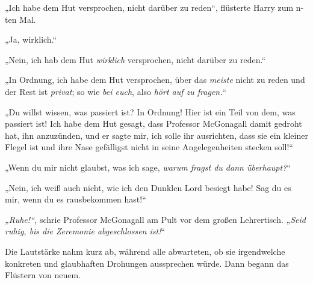 „Ich habe dem Hut versprochen, nicht darüber zu reden“, flüsterte Harry zum n-ten Mal.

„Ja, wirklich.“

„Nein, ich hab dem Hut \emph{wirklich} versprochen, nicht darüber zu reden.“

„In Ordnung, ich habe dem Hut versprochen, über das \emph{meiste} nicht zu reden und der Rest ist \emph{privat}; so wie \emph{bei euch}, also \emph{hört auf zu fragen.}“

„Du willst wissen, was passiert ist? In Ordnung! Hier ist ein Teil von dem, was passiert ist! Ich habe dem Hut gesagt, dass Professor McGonagall damit gedroht hat, ihn anzuzünden, und er sagte mir, ich solle ihr ausrichten, dass sie ein kleiner Flegel ist und ihre Nase gefälligst nicht in seine Angelegenheiten stecken soll!“

„Wenn du mir nicht glaubst, was ich sage, \emph{warum fragst du dann überhaupt?}“

„Nein, ich weiß auch nicht, wie ich den Dunklen Lord besiegt habe! Sag du es mir, wenn du es rausbekommen hast!“

\emph{„Ruhe!“,} schrie Professor McGonagall am Pult vor dem großen Lehrertisch. „\emph{Seid ruhig, bis die Zeremonie abgeschlossen ist!}“

Die Lautstärke nahm kurz ab, während alle abwarteten, ob sie irgendwelche konkreten und glaubhaften Drohungen aussprechen würde. Dann begann das Flüstern von neuem.

